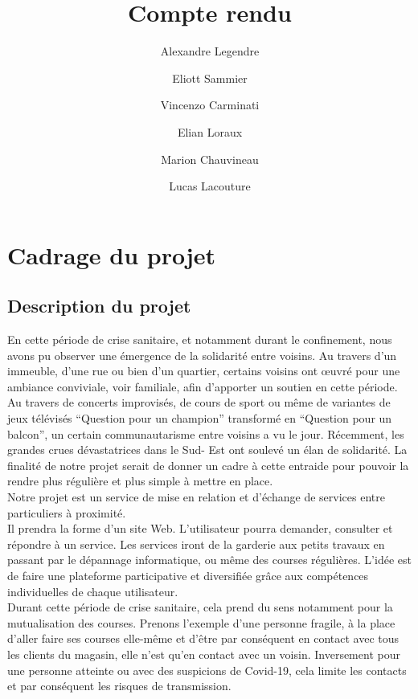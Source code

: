 \documentclass[a4paper,11pt]{article}
\title{Compte rendu}
\author{
  Alexandre Legendre\\
  \and
  Eliott Sammier\\
  \and
  Vincenzo Carminati\\
  \and
  Elian Loraux\\
  \and
  Marion Chauvineau\\
  \and
  Lucas Lacouture\\
}
\begin{document}
\maketitle
\newpage
\tableofcontents

\section{Cadrage du projet}
\subsection{Description du projet}
En cette période de crise sanitaire, et notamment durant le confinement, nous avons pu observer une
émergence de la solidarité entre voisins. Au travers d’un immeuble, d’une rue ou bien d’un quartier,
certains voisins ont œuvré pour une ambiance conviviale, voir familiale, afin d’apporter un soutien en
cette période. Au travers de concerts improvisés, de cours de sport ou même de variantes de jeux
télévisés “Question pour un champion” transformé en “Question pour un balcon”, un certain
communautarisme entre voisins a vu le jour. Récemment, les grandes crues dévastatrices dans le Sud-
Est ont soulevé un élan de solidarité. La finalité de notre projet serait de donner un cadre à cette
entraide pour pouvoir la rendre plus régulière et plus simple à mettre en place.\\

Notre projet est un service de mise en relation et d’échange de services entre particuliers à proximité.\\

Il prendra la forme d’un site Web. L’utilisateur pourra demander, consulter et répondre à un service.
Les services iront de la garderie aux petits travaux en passant par le dépannage informatique, ou
même des courses régulières. L’idée est de faire une plateforme participative et diversifiée grâce aux
compétences individuelles de chaque utilisateur.\\

Durant cette période de crise sanitaire, cela prend du sens notamment pour la mutualisation des
courses. Prenons l’exemple d’une personne fragile, à la place d’aller faire ses courses elle-même et
d’être par conséquent en contact avec tous les clients du magasin, elle n’est qu’en contact avec un
voisin. Inversement pour une personne atteinte ou avec des suspicions de Covid-19, cela limite les
contacts et par conséquent les risques de transmission.\\
\end{document}
